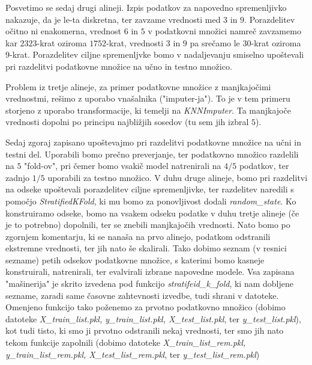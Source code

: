 \documentclass{article}
\begin{document}
Posvetimo se sedaj drugi alineji. Izpis podatkov za napovedno spremenljivko nakazuje, da je le-ta diskretna, ter zavzame vrednosti med $3$ in $9$. Porazdelitev očitno ni enakomerna, vrednost $6$ in $5$ v podatkovni množici namreč zavzamemo kar $2323$-krat oziroma $1752$-krat, vrednosti $3$ in $9$ pa srečamo le $30$-krat oziroma $9$-krat. 
Porazdelitev ciljne spremenljvke bomo v nadaljevanju smiselno upoštevali pri razdelitvi podatkovne množice na učno in testno množico. 

Problem iz tretje alineje, za primer podatkovne množice z manjkajočimi vrednostmi, rešimo z uporabo vnašalnika ("imputer-ja").
To je v tem primeru storjeno z uporabo transformacije, ki temelji na \textit{KNNImputer}. Ta manjkajoče vrednosti dopolni po principu najbližjih sosedov (tu sem jih izbral $5$).

Sedaj zgoraj zapisano upoštevajmo pri razdelitvi podatkovne množice na učni in testni del. Uporabili bomo prečno preverjanje, ter podatkovno množico razdelili na $5$ "fold-ov", pri čemer bomo vsakič model natrenirali na $4/5$ podatkov, ter zadnjo $1/5$ uporabili za testno množico. 
V duhu druge alineje, bomo pri razdelitvi na odseke upoštevali porazdelitev ciljne spremenljivke, ter razdelitev naredili s pomočjo \textit{StratifiedKFold}, ki mu bomo za ponovljivost dodali \textit{random\_state}. 
Ko konstruiramo odseke, bomo na vsakem odseku podatke v duhu tretje alineje (če je to potrebno) dopolnili, ter se znebili manjkajočih vrednosti. Nato bomo po zgornjem komentarju, ki se nanaša na prvo alinejo, podatkom odstranili ekstremne vrednosti, ter jih nato še skalirali.
Tako dobimo seznam (v resnici sezname) petih odsekov podatkovne množice, s katerimi bomo kasneje konstruirali, natrenirali, ter evalvirali izbrane napovedne modele. Vsa zapisana "mašinerija" je skrito izvedena pod funkcijo \textit{stratifeid\_k\_fold}, ki nam dobljene sezname, zaradi same časovne zahtevnosti izvedbe, tudi shrani v datoteke. 
Omenjeno funkcijo tako poženemo za prvotno podatkovno množico (dobimo datoteke \textit{X\_train\_list.pkl, y\_train\_list.pkl, X\_test\_list.pkl}, ter \textit{y\_test\_list.pkl}), kot tudi tisto, ki smo ji prvotno odstranili nekaj vrednosti, ter smo jih nato tekom funkcije zapolnili (dobimo datoteke \textit{X\_train\_list\_rem.pkl, y\_train\_list\_rem.pkl, X\_test\_list\_rem.pkl}, ter \textit{y\_test\_list\_rem.pkl})
\end{document}
